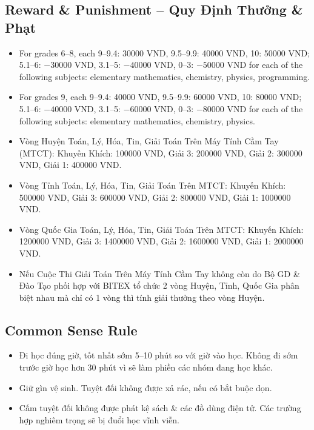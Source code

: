 \documentclass{article}
\numberwithin{equation}{section}
\begin{document}
\subsection{Reward \& Punishment -- Quy Định Thưởng \& Phạt}
\begin{itemize}
	\item For grades 6--8, each 9--9.4: 30000 VND, 9.5--9.9: 40000 VND, 10: 50000 VND; 5.1--6: $-30000$ VND, 3.1--5: $-40000$ VND, 0--3: $-50000$ VND for each of the following subjects: elementary mathematics, chemistry, physics, programming.
	\item For grades 9, each 9--9.4: 40000 VND, 9.5--9.9: 60000 VND, 10: 80000 VND; 5.1--6: $-40000$ VND, 3.1--5: $-60000$ VND, 0--3: $-80000$ VND for each of the following subjects: elementary mathematics, chemistry, physics.
	\item Vòng Huyện Toán, Lý, Hóa, Tin, Giải Toán Trên Máy Tính Cầm Tay (MTCT): Khuyến Khích: 100000 VND, Giải 3: 200000 VND, Giải 2: 300000 VND, Giải 1: 400000 VND.
	\item Vòng Tỉnh Toán, Lý, Hóa, Tin, Giải Toán Trên MTCT: Khuyến Khích: 500000 VND, Giải 3: 600000 VND, Giải 2: 800000 VND, Giải 1: 1000000 VND.
	\item Vòng Quốc Gia Toán, Lý, Hóa, Tin, Giải Toán Trên MTCT: Khuyến Khích: 1200000 VND, Giải 3: 1400000 VND, Giải 2: 1600000 VND, Giải 1: 2000000 VND.
	\item Nếu Cuộc Thi Giải Toán Trên Máy Tính Cầm Tay không còn do Bộ GD \& Đào Tạo phối hợp với BITEX tổ chức 2 vòng Huyện, Tỉnh, Quốc Gia phân biệt nhau mà chỉ có 1 vòng thì tính giải thưởng theo vòng Huyện.
\end{itemize}

\subsection{Common Sense Rule}

\begin{itemize}
	\item Đi học đúng giờ, tốt nhất sớm 5--10 phút so với giờ vào học. Không đi sớm trước giờ học hơn 30 phút vì sẽ làm phiền các nhóm đang học khác.
	\item Giữ gìn vệ sinh. Tuyệt đối không được xả rác, nếu có bắt buộc dọn.
	\item Cấm tuyệt đối không được phát kệ sách \& các đồ dùng điện tử. Các trường hợp nghiêm trọng sẽ bị đuổi học vĩnh viễn.
\end{itemize}

\end{document}
